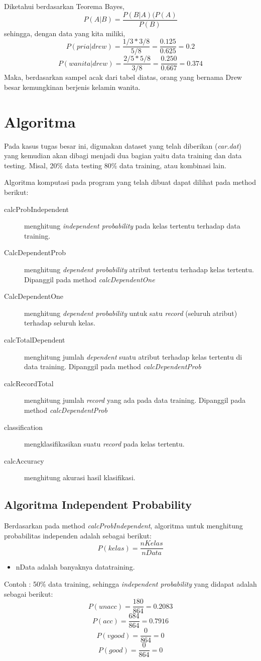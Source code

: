 \documentclass[11pt,a4paper]{report}
\begin{document}
	Diketahui berdasarkan Teorema Bayes,
	\[ P(A|B) = \frac{P(B|A)(P(A)}{P(B)}\]
	sehingga, dengan data yang kita miliki,
	\[ P(pria|drew) = \frac{1/3*3/8}{5/8}=\frac{0.125}{0.625}=0.2\]
	\[ P(wanita|drew) = \frac{2/5*5/8}{3/8}=\frac{0.250}{0.667}=0.374\]
	Maka, berdasarkan sampel acak dari tabel diatas, orang yang bernama Drew besar kemungkinan berjenis kelamin wanita.
	\newpage
	\section*{Algoritma}
	Pada kasus tugas besar ini, digunakan dataset yang telah diberikan (\emph{car.dat}) yang kemudian akan dibagi menjadi dua bagian yaitu data training dan data testing. Misal, 20\% data testing 80\% data training, atau kombinasi lain.
	
	Algoritma komputasi pada program yang telah dibuat dapat dilihat pada method berikut:
	\begin{description}
		\item[calcProbIndependent] menghitung \emph{independent probability} pada kelas tertentu terhadap data training.
		\item[CalcDependentProb] menghitung \emph{dependent probability} atribut tertentu terhadap kelas tertentu. Dipanggil pada method \emph{calcDependentOne}
		\item[CalcDependentOne] menghitung \emph{dependent probability} untuk satu \emph{record} (seluruh atribut) terhadap seluruh kelas.
		\item[calcTotalDependent] menghitung jumlah \emph{dependent} suatu atribut terhadap kelas tertentu di data training. Dipanggil pada method \emph{calcDependentProb}
		\item[calcRecordTotal] menghitung jumlah \emph{record} yang ada pada data training. Dipanggil pada method \emph{calcDependentProb}
		\item[classification] mengklasifikasikan suatu \emph{record} pada kelas tertentu.
		\item[calcAccuracy] menghitung akurasi hasil klasifikasi. 
	\end{description}
	\subsection*{Algoritma Independent Probability}
	Berdasarkan pada method \emph{calcProbIndependent}, algoritma untuk menghitung probabilitas independen adalah sebagai berikut:
	\[ P(kelas) = \frac{nKelas}{nData}\]
	\begin{itemize}
		\item nData adalah banyaknya datatraining.
	\end{itemize}
	Contoh : 50\% data training, sehingga \emph{independent probability} yang didapat adalah sebagai berikut:
	\[ P(unacc) = \frac{180}{864}=0.2083\]
	\[ P(acc) = \frac{684}{864}=0.7916\]
	\[ P(vgood) = \frac{0}{864}=0\]
	\[ P(good) = \frac{0}{864}=0\]
	
\end{document}
